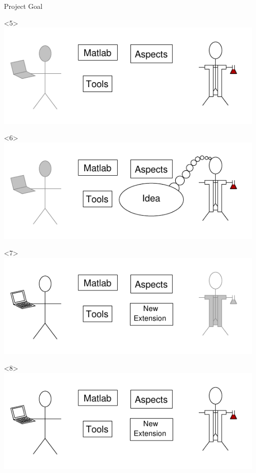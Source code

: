 \begin{frame}{Project Goal}
\begin{onlyenv}
    \end{onlyenv}
    \begin{onlyenv}<5>
      \includegraphics{images/perspectives5_sci.pdf}
    \end{onlyenv}
    \begin{onlyenv}<6>
      \includegraphics{images/perspectives6_sci.pdf}
    \end{onlyenv}
    \begin{onlyenv}<7>
      \includegraphics{images/perspectives7_comp.pdf}
    \end{onlyenv}
    \begin{onlyenv}<8>
      \includegraphics{images/perspectives_base.pdf}
    \end{onlyenv}
\end{frame}

